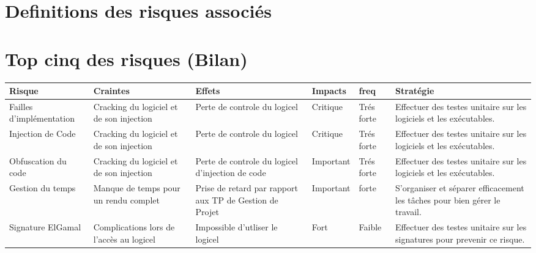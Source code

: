 \chapter{Definitions des risques associés}

\chapter{Top cinq des risques (Bilan)}

\begin{table}[!h]
    \small
    \begin{tabular}{|m{2.5cm}|m{2.5cm}|m{2.5cm}|m{1.5cm}|m{1.5cm}|m{4cm}|} 
	\hline
	\textbf{Risque} & \textbf{Craintes} & \textbf{Effets} & \textbf{Impacts} & \textbf{freq} & \textbf{Stratégie}\\
	\hline
	Failles d'implémentation & Cracking du logiciel et de son injection &  Perte de controle du logicel & Critique & Trés forte & Effectuer des testes unitaire sur les logiciels et les exécutables.\\
	\hline
	Injection de Code & Cracking du logiciel et de son injection &  Perte de controle du logicel & Critique & Trés forte & Effectuer des testes unitaire sur les logiciels et les exécutables.\\
	\hline
	Obfuscation du code & Cracking du logiciel et de son injection &  Perte de controle du logicel d'injection de code & Important & Trés forte & Effectuer des testes unitaire sur les logiciels et les exécutables.\\
	\hline
	Gestion du temps & Manque de temps pour un rendu complet &  Prise de retard par rapport aux TP de Gestion de Projet & Important & forte & S’organiser et séparer efficacement les tâches pour bien gérer le travail.\\
	\hline
	Signature ElGamal & Complications lors de l'accès au logicel &  Impossible d'utliser le logicel & Fort & Faible & Effectuer des testes unitaire sur les signatures pour prevenir ce risque.\\
	\hline	    
    \end{tabular}
\end{table}

